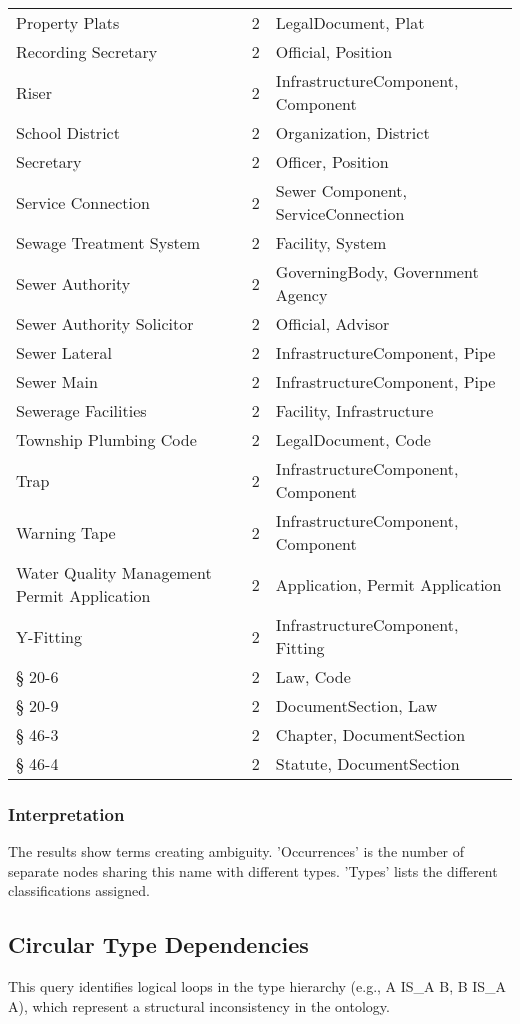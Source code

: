 \begin{longtable}{p{} p{} p{}}
Property Plats & 2 & LegalDocument, Plat \\
Recording Secretary & 2 & Official, Position \\
Riser & 2 & InfrastructureComponent, Component \\
School District & 2 & Organization, District \\
Secretary & 2 & Officer, Position \\
Service Connection & 2 & Sewer Component, ServiceConnection \\
Sewage Treatment System & 2 & Facility, System \\
Sewer Authority & 2 & GoverningBody, Government Agency \\
Sewer Authority Solicitor & 2 & Official, Advisor \\
Sewer Lateral & 2 & InfrastructureComponent, Pipe \\
Sewer Main & 2 & InfrastructureComponent, Pipe \\
Sewerage Facilities & 2 & Facility, Infrastructure \\
Township Plumbing Code & 2 & LegalDocument, Code \\
Trap & 2 & InfrastructureComponent, Component \\
Warning Tape & 2 & InfrastructureComponent, Component \\
Water Quality Management Permit Application & 2 & Application, Permit Application \\
Y-Fitting & 2 & InfrastructureComponent, Fitting \\
§ 20-6 & 2 & Law, Code \\
§ 20-9 & 2 & DocumentSection, Law \\
§ 46-3 & 2 & Chapter, DocumentSection \\
§ 46-4 & 2 & Statute, DocumentSection \\
\bottomrule
\end{longtable}
\subsubsection*{Interpretation}
The results show terms creating ambiguity. 'Occurrences' is the number of separate nodes sharing this name with different types. 'Types' lists the different classifications assigned.
\clearpage
\subsection*{Circular Type Dependencies}
This query identifies logical loops in the type hierarchy (e.g., A IS\_A B, B IS\_A A), which represent a structural inconsistency in the ontology.

